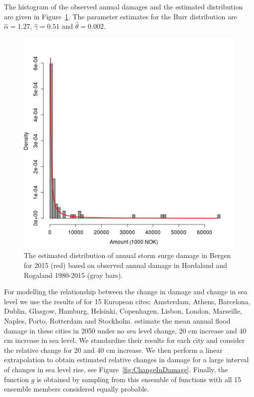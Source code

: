 \documentclass[draft,linenumbers]{agujournal}
\begin{document}
The histogram of the observed annual damages and the estimated distribution are given in Figure~\ref{fig:BergenDamageDist}. The parameter estimates for the Burr distribution are $\hat{\alpha} = 1.27$, $\hat{\gamma} = 0.51$ and $\hat{\theta} = 0.002$. 

\begin{figure}
\begin{center}
\includegraphics[width=\linewidth]{DamageDistribution.png}
\caption{ The estimated distribution of annual storm surge damage in Bergen for 2015 (red) based on observed annual damage in Hordaland and Rogaland 1980-2015 (gray bars). }
\label{fig:BergenDamageDist}
\end{center}
\end{figure}


For modelling the relationship between the change in damage and change in sea level we use the results of \cite{Hallegatte&2013} for 15 European cites: Amsterdam, Athens, Barcelona, Dublin, Glasgow, Hamburg, Helsinki, Copenhagen, Lisbon, London, Marseille, Naples, Porto, Rotterdam and Stockholm. \cite{Hallegatte&2013} estimate the mean annual flood damage in these cities in 2050 under no sea level change, 20 cm increase and 40 cm increase in sea level. We standardize their results for each city and consider the relative change for 20 and 40 cm increase. We then perform a linear extrapolation to obtain estimated relative changes in damage for a large interval of changes in sea level rise, see Figure~\ref{fig:ChangeInDamage}. Finally, the function $g$ is obtained by sampling from this ensemble of functions with all 15 ensemble members considered equally probable. 
\end{document}
